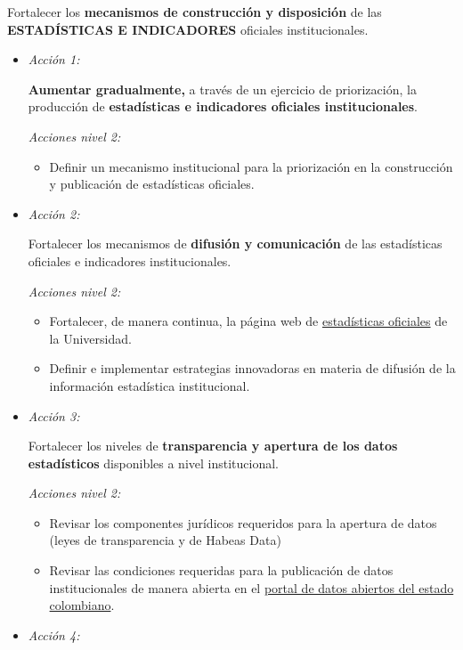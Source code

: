 \documentclass[
]{book}
\providecommand{\tightlist}{%
  \setlength{\itemsep}{0pt}\setlength{\parskip}{0pt}}
\begin{document}
Fortalecer los \textbf{mecanismos de construcción y disposición} de las \textbf{ESTADÍSTICAS E INDICADORES} oficiales institucionales.

\begin{itemize}
\item
  \emph{Acción 1:}

  \textbf{Aumentar gradualmente,} a través de un ejercicio de priorización, la producción de \textbf{estadísticas e indicadores oficiales institucionales}.

  \emph{Acciones nivel 2:}

  \begin{itemize}
  \tightlist
  \item
    Definir un mecanismo institucional para la priorización en la construcción y publicación de estadísticas oficiales.
  \end{itemize}
\item
  \emph{Acción 2:}

  Fortalecer los mecanismos de \textbf{difusión y comunicación} de las estadísticas oficiales e indicadores institucionales.

  \emph{Acciones nivel 2:}

  \begin{itemize}
  \tightlist
  \item
    Fortalecer, de manera continua, la página web de \href{http://estadisticas.unal.edu.co/home/}{estadísticas oficiales} de la Universidad.
  \item
    Definir e implementar estrategias innovadoras en materia de difusión de la información estadística institucional.
  \end{itemize}
\item
  \emph{Acción 3:}

  Fortalecer los niveles de \textbf{transparencia y apertura de los datos estadísticos} disponibles a nivel institucional.

  \emph{Acciones nivel 2:}

  \begin{itemize}
  \tightlist
  \item
    Revisar los componentes jurídicos requeridos para la apertura de datos (leyes de transparencia y de Habeas Data)
  \item
    Revisar las condiciones requeridas para la publicación de datos institucionales de manera abierta en el \href{https://datos.gov.co/}{portal de datos abiertos del estado colombiano}.
  \end{itemize}
\item
  \emph{Acción 4:}


\end{itemize}
\end{document}
